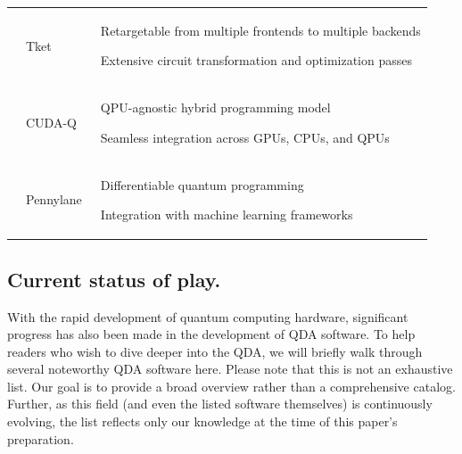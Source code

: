 \documentclass[a4paper,onecolumn,11pt,unpublished]{quantumarticle}
\begin{document}
\begin{table}[!ht]
\begin{tabular}{P{1.55cm}|P{2.6cm}|L{9.6cm}}
    & Tket~\cite{sivarajah2020t}
    & \begin{tightitemize}
        \item Retargetable from multiple frontends to multiple backends
        \item Extensive circuit transformation and optimization passes
      \end{tightitemize} 
    \\ 

    & CUDA-Q~\cite{CUDA-Q}
    & \begin{tightitemize}
        \item QPU-agnostic hybrid programming model
        \item Seamless integration across GPUs, CPUs, and QPUs
      \end{tightitemize} 
    \\ 
    
    & Pennylane~\cite{bergholmPennyLaneAutomaticDifferentiation2022}
    & \begin{tightitemize}
        \item Differentiable quantum programming
        \item Integration with machine learning frameworks
      \end{tightitemize}
    \\ \hline  
  \end{tabular}
\end{table}



\subsection{Current status of play.}
With the rapid development of quantum computing hardware, significant progress has also been made in the development of QDA software. To help readers who wish to dive deeper into the QDA, we will briefly walk through several noteworthy QDA software here. Please note that this is not an exhaustive list. Our goal is to provide a broad overview rather than a comprehensive catalog. Further, as this field (and even the listed software themselves) is continuously evolving, the list reflects only our knowledge at the time of this paper's preparation.
\end{document}
